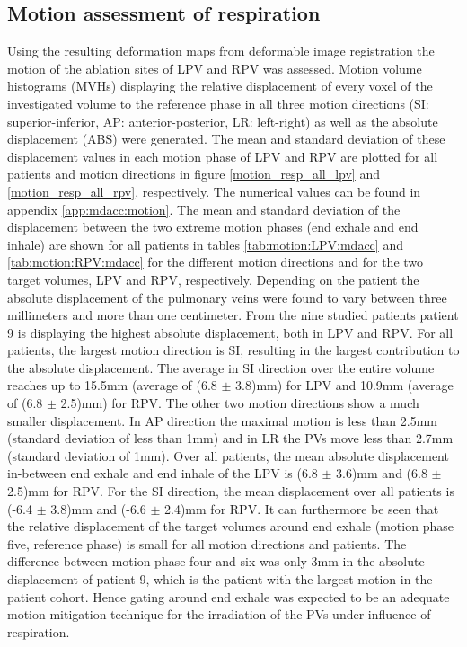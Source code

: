 \documentclass[type=dr, dr=rernat, accentcolor=tud7b,colorbacktitle, bigchapter, openright, twoside, 12pt ]{tudthesis}
\begin{document}
\subsection{Motion assessment of respiration}
\label{motion}
Using the resulting deformation maps from deformable image registration the motion of the ablation sites of LPV and RPV was assessed. Motion 
volume histograms (MVHs) \cite{Ric13} displaying the relative displacement of every voxel of the investigated volume to the reference phase 
in all three motion directions (SI: superior-inferior, AP: anterior-posterior, LR: left-right) as well as the absolute displacement (ABS) 
were generated. The mean and standard deviation of these displacement values in each motion phase of LPV and RPV are plotted for all patients 
and motion directions in figure \ref{motion_resp_all_lpv} and \ref{motion_resp_all_rpv}, respectively. The numerical values can be found 
in appendix \ref{app:mdacc:motion}. \newline
\newline
The mean and standard deviation of the displacement between the two extreme motion phases (end exhale and end inhale) are shown for all 
patients in tables \ref{tab:motion:LPV:mdacc} and \ref{tab:motion:RPV:mdacc} for the different motion directions and for the two target volumes, LPV and 
RPV, respectively. 
Depending on the patient the absolute displacement of the pulmonary veins were found to vary between three millimeters and more than 
one centimeter. From the nine studied patients patient 9 is displaying the highest absolute displacement, both in LPV and RPV.
For all patients, the largest motion direction is SI, resulting in the largest contribution to the absolute displacement. The 
average in SI direction over the entire volume reaches up to 15.5mm (average of (6.8 $\pm$ 3.8)mm) for LPV and 10.9mm 
(average of (6.8 $\pm$ 2.5)mm) for RPV. The other two motion directions show a much smaller displacement. In AP direction the maximal 
motion is less than 2.5mm (standard deviation of less than 1mm) and in LR the PVs move less than 2.7mm (standard deviation of 1mm).
Over all patients, the mean absolute displacement in-between end exhale and end inhale of the LPV is (6.8 $\pm$ 3.6)mm and 
(6.8 $\pm$ 2.5)mm for RPV. For the SI direction, the mean displacement over all patients is (-6.4 $\pm$ 3.8)mm and (-6.6 $\pm$ 2.4)mm for 
RPV.\newline
\newline
It can furthermore be seen that the relative displacement of the target volumes around end exhale (motion phase five, reference phase) is small 
for all motion directions and patients. The difference between motion phase four and six was only 3mm in the absolute displacement 
of patient 9, which is the patient with the largest motion in the patient cohort. Hence gating around end exhale was expected to be an 
adequate motion mitigation technique for the irradiation of the PVs under influence of respiration. 
\end{document}
